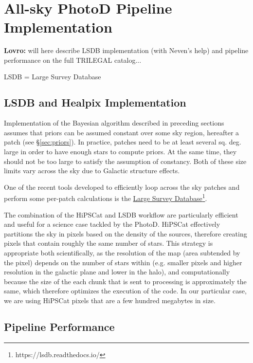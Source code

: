 

\section{All-sky PhotoD Pipeline Implementation \label{sec:LSDBpipe}}


{\bf Lovro:} will here describe LSDB implementation (with Neven's help) and pipeline performance on the full TRILEGAL catalog...

LSDB = Large Survey Database 


\subsection{LSDB and Healpix Implementation} 

Implementation of the Bayesian algorithm described in preceding sections assumes that priors can be assumed constant over some sky region, hereafter a patch (see \S\ref{sec:priors}). In practice,  patches need to be at least several sq. deg. large in order to have enough stars to compute priors. At the same time, they should not be too large to satisfy the assumption of constancy. Both of these size limits vary across the sky due to Galactic structure effects. 

One of the recent tools developed to efficiently loop across the sky patches and perform some per-patch calculations is the \href{https://lsdb.readthedocs.io/}{Large Survey Database}\footnote{https://lsdb.readthedocs.io/}.

The combination of the HiPSCat and LSDB workflow are particularly efficient and useful for a science case tackled by the PhotoD. HiPSCat effectively partitions the sky in pixels based on the density of the sources, therefore creating pixels that contain roughly the same number of stars. This strategy is appropriate both scientifically, as the resolution of the map (area subtended by the pixel) depends on the number of stars within (e.g. smaller pixels and higher resolution in the galactic plane and lower in the halo), and computationally because the size of the each chunk that is sent to processing is approximately the same, which therefore optimizes the execution of the code. In our particular case, we are using HiPSCat pixels that are a few hundred megabytes in size.
 
 
\subsection{Pipeline Performance}

